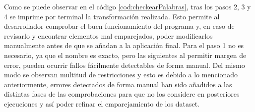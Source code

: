 Como se puede observar en el código \ref{cod:checkearPalabras}, tras los pasos 2, 3 y 4 se imprime por terminal la transformación realizada. Esto permite al desarrollador comprobar el buen funcionamiento del programa y, en caso de revisarlo y encontrar elementos mal emparejados, poder modificarlos manualmente antes de que se añadan a la aplicación final. Para el paso 1 no es necesario, ya que el nombre es exacto, pero las siguientes al permitir margen de error, pueden ocurrir fallos fácilmente detectables de forma manual. Del mismo modo se observan multitud de restricciones y esto es debido a lo mencionado anteriormente, errores detectados de forma manual han sido añadidos a las distintas fases de las comprobaciones para que no los considere en posteriores ejecuciones y así poder refinar el emparejamiento de los dataset.




